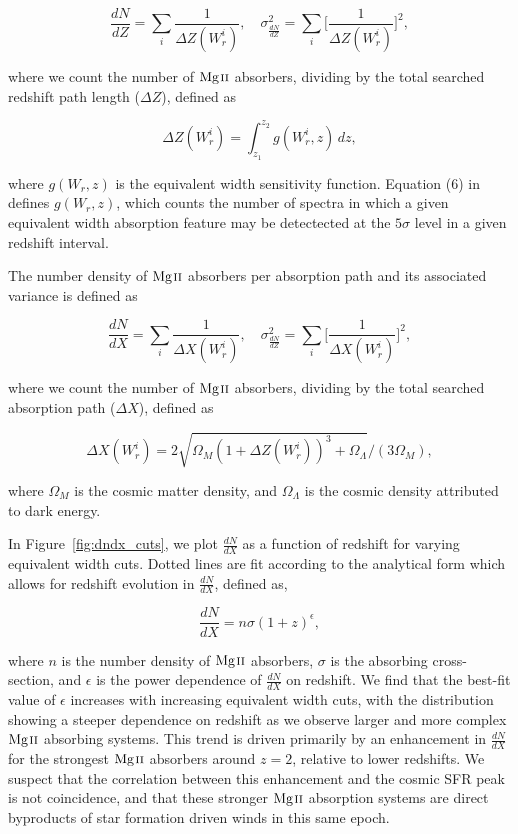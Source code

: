 \documentclass[iop,apj,numberedappendix,appendixfloats,twocolappendix]{emulateapj}
\begin{document}
\begin{equation}
\frac{d N}{d Z} = \sum_{i}\frac{1}{\Delta Z(W_r^i)},\quad \sigma^2_{\frac{d N}{d Z}} = \sum_{i} \Big[\frac{1}{\Delta Z(W_r^i)}\Big]^2,
\label{eqn:dndz}
\end{equation}

where we count the number of ${\hbox{{\rm Mg}\kern 0.1em{\sc ii}}}$ absorbers, dividing by the total searched redshift path length ($\Delta Z$), defined as

\begin{equation}
\Delta Z(W_r^i) = \int_{z_1}^{z_2} g(W_r^i, z)\,dz,
\label{eqn:deltaz}
\end{equation}

where $g(W_r, z)$ is the equivalent width sensitivity function. Equation (6) in \cite{Lanzetta1987} defines $g(W_r, z)$, which counts the number of spectra in which a given equivalent width absorption feature may be detectected at the $5\sigma$ level in a given redshift interval. 

The number density of ${\hbox{{\rm Mg}\kern 0.1em{\sc ii}}}$ absorbers per absorption path and its associated variance is defined as

\begin{equation}
\frac{d N}{d X} = \sum_{i}\frac{1}{\Delta X(W_r^i)},\quad \sigma^2_{\frac{d N}{d Z}} = \sum_{i} \Big[\frac{1}{\Delta X(W_r^i)}\Big]^2,
\label{eqn:dndx}
\end{equation}

where we count the number of ${\hbox{{\rm Mg}\kern 0.1em{\sc ii}}}$ absorbers, dividing by the total searched absorption path ($\Delta X$), defined as

\begin{equation}
\Delta X(W_r^i) = 2 \sqrt{\Omega_M (1 + \Delta Z(W_r^i))^3 + \Omega_{\Lambda}} / (3 \Omega_M),
\label{eqn:deltax}
\end{equation}

where $\Omega_M$ is the cosmic matter density, and $\Omega_{\Lambda}$ is the cosmic density attributed to dark energy.

In Figure~\ref{fig:dndx_cuts}, we plot $\frac{dN}{dX}$ as a function of redshift for varying equivalent width cuts. Dotted lines are fit according to the analytical form which allows for redshift evolution in $\frac{dN}{dX}$, defined as,

\begin{equation}
\frac{dN}{dX} = n\sigma (1 + z)^{\epsilon},
\label{eqn:dndxfit}
\end{equation}

where $n$ is the number density of ${\hbox{{\rm Mg}\kern 0.1em{\sc ii}}}$ absorbers, $\sigma$ is the absorbing cross-section, and $\epsilon$ is the power dependence of $\frac{dN}{dX}$ on redshift. We find that the best-fit value of $\epsilon$ increases with increasing equivalent width cuts, with the distribution showing a steeper dependence on redshift as we observe larger and more complex ${\hbox{{\rm Mg}\kern 0.1em{\sc ii}}}$ absorbing systems. This trend is driven primarily by an enhancement in $\frac{dN}{dX}$ for the strongest ${\hbox{{\rm Mg}\kern 0.1em{\sc ii}}}$ absorbers around $z = 2$, relative to lower redshifts. We suspect that the correlation between this enhancement and the cosmic SFR peak is not coincidence, and that these stronger ${\hbox{{\rm Mg}\kern 0.1em{\sc ii}}}$ absorption systems are direct byproducts of star formation driven winds in this same epoch. 
\end{document}
